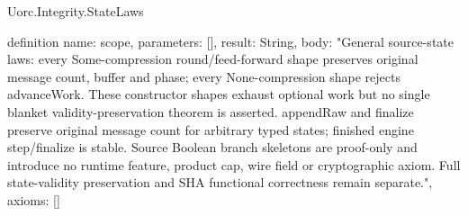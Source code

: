\begin{lexlean}{Uorc.Integrity.StateLaws}
\begin{semanticmodule}
definition{
  name: scope,
  parameters: [],
  result: String,
  body: "General source-state laws: every Some-compression round/feed-forward shape preserves original message count, buffer and phase; every None-compression shape rejects advanceWork. These constructor shapes exhaust optional work but no single blanket validity-preservation theorem is asserted. appendRaw and finalize preserve original message count for arbitrary typed states; finished engine step/finalize is stable. Source Boolean branch skeletons are proof-only and introduce no runtime feature, product cap, wire field or cryptographic axiom. Full state-validity preservation and SHA functional correctness remain separate.",
  axioms: []
}
\end{semanticmodule}
\end{lexlean}
